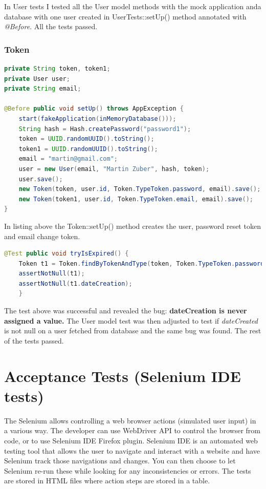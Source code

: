 \documentclass[12pt,twoside,a4paper]{report}
\begin{document}
In User tests I tested all the User model methods with the mock application anda
 database with one user created in UserTests::setUp() method annotated with \emph{@Before}. All the tests passed.

\subsubsection{Token}\label{5.2.1.3}

\begin{lstlisting}[language=java]
private String token, token1;
private User user;
private String email;
		
@Before public void setUp() throws AppException {
	start(fakeApplication(inMemoryDatabase()));
    String hash = Hash.createPassword("password1");
    token = UUID.randomUUID().toString();
    token1 = UUID.randomUUID().toString();
    email = "martin@gmail.com";
    user = new User(email, "Martin Zuber", hash, token);
    user.save();
    new Token(token, user.id, Token.TypeToken.password, email).save();
    new Token(token1, user.id, Token.TypeToken.email, email).save();
}
\end{lstlisting}
In listing above the Token::setUp() method creates the user, password reset token and email change token.

\begin{lstlisting}[language=java]
@Test public void tryIsExpired() {
	Token t1 = Token.findByTokenAndType(token, Token.TypeToken.password);
	assertNotNull(t1);
	assertNotNull(t1.dateCreation);
	}
\end{lstlisting}
The test above was successful and revealed the bug: \textbf{dateCreation is never assigned a value.} The User model test was then adjusted to test if \emph{dateCreated} is not null on a user fetched from database and the same bug was found. The rest of the tests passed.


\section{Acceptance Tests (Selenium IDE tests)}\label{5.3}

The Selenium allows controlling a web browser actions (simulated user input) in a various way. The developer can use WebDriver API to control the browser from code, or to use Selenium IDE Firefox plugin. Selenium IDE is an automated web testing tool that allows the user to navigate and interact with a website and have Selenium track those navigations and changes. You can then choose to let Selenium re-run these while looking for any inconsistencies or errors. The tests are stored in HTML files where action steps are stored in a table. 
\end{document}
